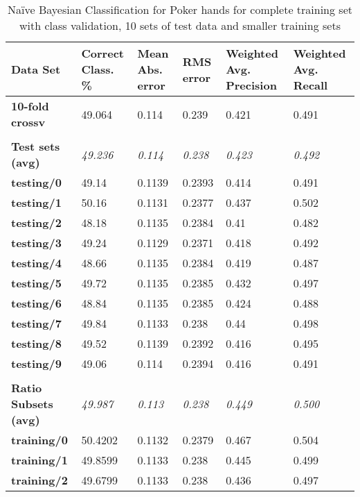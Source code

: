 \documentclass[11pt, a4paper]{article}
\begin{document}
\begin{table}[htbp]
  \centering
  \begin{tabular}{p{3cm}p{1.5cm}p{1.5cm}p{1.5cm}p{1.5cm}p{1.5cm}}
    \toprule
    \textbf{Data Set} & Correct Class. \% & Mean Abs. error & RMS error & Weighted Avg. Precision & Weighted Avg. Recall \\
    \midrule
    \textbf{10-fold crossv} & 49.064 & 0.114 & 0.239 & 0.421 & 0.491 \\
    \textbf{} &       &       &       &       &  \\
    \textbf{Test sets (avg)} & \textit{49.236} & \textit{0.114} & \textit{0.238} & \textit{0.423} & \textit{0.492} \\
    \textbf{   testing/0} & 49.14 & 0.1139 & 0.2393 & 0.414 & 0.491 \\
    \textbf{   testing/1} & 50.16 & 0.1131 & 0.2377 & 0.437 & 0.502 \\
    \textbf{   testing/2} & 48.18 & 0.1135 & 0.2384 & 0.41  & 0.482 \\
    \textbf{   testing/3} & 49.24 & 0.1129 & 0.2371 & 0.418 & 0.492 \\
    \textbf{   testing/4} & 48.66 & 0.1135 & 0.2384 & 0.419 & 0.487 \\
    \textbf{   testing/5} & 49.72 & 0.1135 & 0.2385 & 0.432 & 0.497 \\
    \textbf{   testing/6} & 48.84 & 0.1135 & 0.2385 & 0.424 & 0.488 \\
    \textbf{   testing/7} & 49.84 & 0.1133 & 0.238 & 0.44  & 0.498 \\
    \textbf{   testing/8} & 49.52 & 0.1139 & 0.2392 & 0.416 & 0.495 \\
    \textbf{   testing/9} & 49.06 & 0.114 & 0.2394 & 0.416 & 0.491 \\
    \textbf{} &       &       &       &       &  \\
    \textbf{Ratio Subsets (avg)} & \textit{49.987} & \textit{0.113} & \textit{0.238} & \textit{0.449} & \textit{0.500} \\
    \textbf{   training/0} & 50.4202 & 0.1132 & 0.2379 & 0.467 & 0.504 \\
    \textbf{   training/1} & 49.8599 & 0.1133 & 0.238 & 0.445 & 0.499 \\
    \textbf{   training/2} & 49.6799 & 0.1133 & 0.238 & 0.436 & 0.497 \\
    \bottomrule
    \end{tabular}%

	\caption{Na\"ive Bayesian Classification for Poker hands for complete training set with class validation, 10 sets of test data and smaller training sets}   
  \label{tab:nbresults}%
\end{table}%
\end{document}
